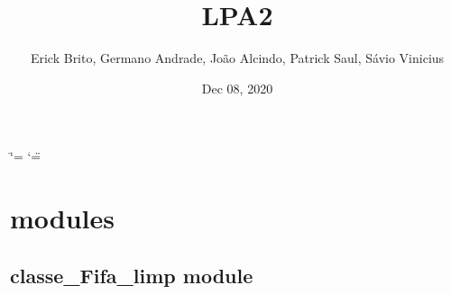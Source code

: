 \documentclass[letterpaper,10pt,brazil]{sphinxmanual}
\title{LP\sphinxhyphen{}A2}
\date{Dec 08, 2020}
\author{Erick Brito, Germano Andrade, João Alcindo, Patrick Saul, Sávio Vinicius}
\begin{document}
\ifdefined\shorthandoff
  \ifnum\catcode`\=\string=\active\shorthandoff{=}\fi
  \ifnum\catcode`\"=\active{}\fi
\fi

\pagestyle{empty}
\sphinxmaketitle
\pagestyle{plain}
\sphinxtableofcontents
\pagestyle{normal}
\label{\detokenize{index::doc}}



\chapter{modules}
\label{\detokenize{modules:modules}}\label{\detokenize{modules::doc}}

\section{classe\_Fifa\_limp module}
\label{\detokenize{classe_Fifa_limp:module-classe_Fifa_limp}}\label{\detokenize{classe_Fifa_limp:classe-fifa-limp-module}}\label{\detokenize{classe_Fifa_limp::doc}}
\end{document}

